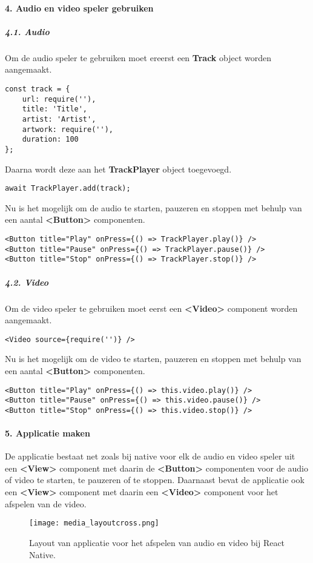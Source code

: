 \paragraph{4. Audio en video speler gebruiken}
\subparagraph{4.1. Audio}
Om de audio speler te gebruiken moet ereerst een \textbf{Track} object worden aangemaakt.
\begin{verbatim}
const track = {
    url: require(''),
    title: 'Title',
    artist: 'Artist',
    artwork: require(''),
    duration: 100
};
\end{verbatim}
Daarna wordt deze aan het \textbf{TrackPlayer} object toegevoegd.
\begin{verbatim}
await TrackPlayer.add(track);
\end{verbatim}
Nu is het mogelijk om de audio te starten, pauzeren en stoppen met behulp 
van een aantal \textbf{<Button>} componenten.
\begin{verbatim}
<Button title="Play" onPress={() => TrackPlayer.play()} />
<Button title="Pause" onPress={() => TrackPlayer.pause()} />
<Button title="Stop" onPress={() => TrackPlayer.stop()} />
\end{verbatim}

\subparagraph{4.2. Video}
Om de video speler te gebruiken moet eerst een \textbf{<Video>} component worden aangemaakt.
\begin{verbatim}
<Video source={require('')} />
\end{verbatim}
Nu is het mogelijk om de video te starten, pauzeren en stoppen met behulp
van een aantal \textbf{<Button>} componenten.
\begin{verbatim}
<Button title="Play" onPress={() => this.video.play()} />
<Button title="Pause" onPress={() => this.video.pause()} />
<Button title="Stop" onPress={() => this.video.stop()} />
\end{verbatim}

\paragraph{5. Applicatie maken}
De applicatie bestaat net zoals bij native voor elk de audio en video speler uit een \textbf{<View>}
component met daarin de \textbf{<Button>} componenten voor de audio of video te starten, te pauzeren
of te stoppen. Daarnaast bevat de applicatie ook een \textbf{<View>} component met daarin een
\textbf{<Video>} component voor het afspelen van de video.
\begin{figure}[H]
    \centering
    \texttt{[image: media\_layoutcross.png]}
    \caption{Layout van applicatie voor het afspelen van audio en video bij React Native.}
\end{figure}


